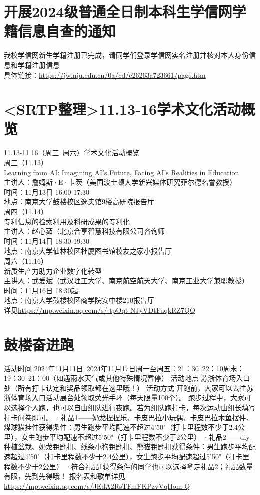 \documentclass[letterpaper, 12pt]{article}
\begin{document}
\begin{multicols}{2}
\section{开展2024级普通全日制本科生学信网学籍信息自查的通知}
我校学信网新生学籍注册已完成，请同学们登录学信网实名注册并核对本人身份信息和学籍注册信息\\
具体链接：\url{https://jw.nju.edu.cn/0a/cd/c26263a723661/page.htm}\\



\section{<SRTP整理>11.13-16学术文化活动概览}

11.13-11.16（周三~周六）学术文化活动概览\\
周三（11.13）\\
Learning from AI: Imagining AI’s Future, Facing AI’s Realities in Education\\
主讲人：詹姆斯·E·卡茨（美国波士顿大学新兴媒体研究菲尔德名誉教授）\\
时间：11月13日 16:00-17:30\\
地点：南京大学鼓楼校区逸夫馆9楼高研院报告厅\\
周四（11.14）\\
专利信息的检索利用及科研成果的专利化\\
主讲人：赵心茹（北京合享智慧科技有限公司咨询师\\
时间：11月14日 18:30-19:30\\
地点：南京大学仙林校区杜厦图书馆校友之家小报告厅\\
周六（11.16）\\
新质生产力助力企业数字化转型\\
主讲人：武爱斌（武汉理工大学、南京航空航天大学、南京工业大学兼职教授）\\
时间：11月16日 18:30起\\
地点：南京大学鼓楼校区商学院安中楼210报告厅\\
详见\url{https://mp.weixin.qq.com/s/-tpOqt-NJyVDtFuqkRZ7QQ}\\

\section{鼓楼奋进跑}
活动时间
2024年11月11日~2024年11月17日周一至周五：21：30~22：10周末：19：30~21：00（如遇雨水天气或其他特殊情况暂停）
活动地点
苏浙体育场入口处（所有打卡认定和奖品领取都在这里哦！）
活动方式
开跑前，大家可以去往苏浙体育场入口活动展台处领取荧光手环（每天限量100个）。
跑步过程中，大家可以选择个人跑，也可以自由组队进行夜跑。若为组队跑打卡，每次运动由组长填写打卡问卷即可。
·礼品1——奶龙捏捏乐、卡皮巴拉小玩偶、卡皮巴拉木鱼摆件、煤球猫挂件获得条件：男生跑步平均配速不超过4'50"（打卡里程数不少于2.4公里），女生跑步平均配速不超过5'50"（打卡里程数不少于2公里）
·礼品2——diy种植盆栽、奶龙钥匙扣、线条小狗钥匙扣、熊猫钥匙扣获得条件：男生跑步平均配速超过4'50"（打卡里程数不少于2.4公里），女生跑步平均配速超过5'50"（打卡里程数不少于2公里）
·符合礼品1获得条件的同学也可以选择拿走礼品2；礼品数量有限，先到先得哦！
报名表和歌单详见\url{https://mp.weixin.qq.com/s/JEdA2RsTFmFKPzvVqHom-Q}

\end{multicols} 
\end{document}
